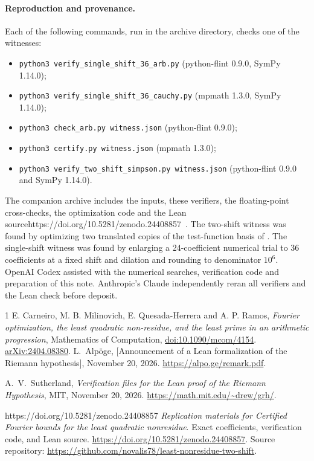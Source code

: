 \documentclass[11pt]{article}
\newcommand*{\replicationURL}{https://doi.org/10.5281/zenodo.24408857}
\newcommand*{\ifReplicationURL}[1]{\ifx\replicationURL\empty\else#1\fi}
\begin{document}
\paragraph{Reproduction and provenance.}
Each of the following commands, run in the archive directory, checks one
of the witnesses:
\begin{itemize}
\item \texttt{python3 verify\_single\_shift\_36\_arb.py} (python-flint 0.9.0, SymPy 1.14.0);
\item \texttt{python3 verify\_single\_shift\_36\_cauchy.py} (mpmath 1.3.0, SymPy 1.14.0);
\item \texttt{python3 check\_arb.py witness.json} (python-flint 0.9.0);
\item \texttt{python3 certify.py witness.json} (mpmath 1.3.0);
\item \texttt{python3 verify\_two\_shift\_simpson.py witness.json}\newline
      (python-flint 0.9.0 and SymPy 1.14.0).
\end{itemize}
The companion archive includes the inputs, these verifiers, the
floating-point cross-checks, the optimization code and the Lean
source\ifReplicationURL{~\cite{replication}}. The two-shift witness was
found by optimizing two translated copies of the test-function basis
of \cite[\S6]{cmqr}. The single-shift witness was found by enlarging a
24-coefficient numerical trial to 36 coefficients at a fixed shift and
dilation and rounding to denominator $10^6$. OpenAI Codex assisted with
the numerical searches, verification code and preparation of this note.
Anthropic's Claude independently reran all verifiers and the Lean check
before deposit.

\begin{thebibliography}{1}
 E. Carneiro, M. B. Milinovich, E. Quesada-Herrera and
A. P. Ramos, \emph{Fourier optimization, the least quadratic non-residue,
and the least prime in an arithmetic progression}, Mathematics of
Computation, \href{https://doi.org/10.1090/mcom/4154}{doi:10.1090/mcom/4154}.
\href{https://arxiv.org/abs/2404.08380}{arXiv:2404.08380}.
 L.~Alp\"oge, [Announcement of a Lean formalization of the
Riemann hypothesis], November 20, 2026.
\url{https://alpo.ge/remark.pdf}.

 A.~V.~Sutherland, \emph{Verification files for the
Lean proof of the Riemann Hypothesis}, MIT, November 20, 2026.
\url{https://math.mit.edu/~drew/grh/}.

\ifReplicationURL{ \emph{Replication materials for
Certified Fourier bounds for the least quadratic nonresidue}. Exact
coefficients, verification code, and Lean source.
\expandafter\url\expandafter{\replicationURL}. Source repository:
\url{https://github.com/novalis78/least-nonresidue-two-shift}.}
\end{thebibliography}
\end{document}
